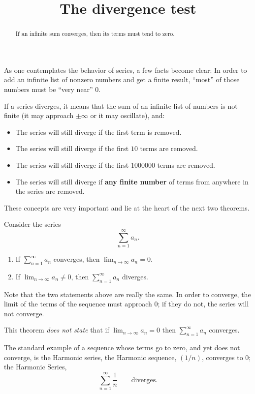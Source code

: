 \documentclass{ximera}
\title[Dig-In:]{The divergence test}
\begin{document}
\begin{abstract}
If an infinite sum converges, then its terms must tend to zero.
\end{abstract}
\maketitle


As one contemplates the behavior of series, a few facts become clear:
In order to add an infinite list of nonzero numbers and get a finite
result, ``most'' of those numbers must be ``very near'' $0$.

If a series diverges, it means that the sum of an infinite list of
numbers is not finite (it may approach $\pm \infty$ or it may
oscillate), and:
\begin{itemize}
\item The series will still diverge if the first term is removed.
\item The series will still diverge if the first $10$ terms are
  removed.
\item The series will still diverge if the first $1000000$ terms
  are removed.
\item The series will still diverge if \textbf{any finite number} of terms
  from anywhere in the series are removed.
\end{itemize}

These concepts are very important and lie at the heart of the next two
theorems.

\begin{theorem}
  Consider the series
  \[
  \sum_{n=1}^\infty a_n.
  \]
\begin{enumerate}
\item If $\sum_{n=1}^\infty a_n$ converges, then $\lim_{n\to\infty}a_n
  =0$.
\item If $\lim_{n\to\infty}a_n \neq 0$, then $\sum_{n=1}^\infty a_n$
  diverges.
\end{enumerate}
\end{theorem}
Note that the two statements above are really the same. In order to
converge, the limit of the terms of the sequence must approach $0$; if
they do not, the series will not converge.
\begin{warning}
  This theorem \emph{does not state} that if $\lim_{n\to\infty} a_n =
  0$ then $\sum_{n=1}^\infty a_n$ converges.
\end{warning}

The standard example of a sequence whose terms go to zero, and yet does
not converge, is the Harmonic series, the Harmonic sequence,
$(1/n)$, converges to $0$; the Harmonic Series,
\[
\sum_{n=1}^\infty\frac{1}{n}\qquad\text{diverges.}
\]
\end{document}
